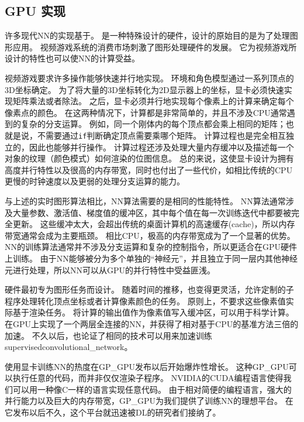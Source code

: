 \subsection{GPU 实现}
\label{sec:gpu_implementations}

许多现代\gls{NN}的实现基于。
是一种特殊设计的硬件，设计的原始目的是为了处理图形应用。
视频游戏系统的消费市场刺激了图形处理硬件的发展。
它为视频游戏所设计的特性也可以使\gls{NN}的计算受益。

视频游戏要求许多操作能够快速并行地实现。
环境和角色模型通过一系列顶点的3D坐标确定。
为了将大量的3D坐标转化为2D显示器上的坐标，显卡必须快速实现矩阵乘法或者除法。
之后，显卡必须并行地实现每个像素上的计算来确定每个像素点的颜色。
在这两种情况下，计算都是非常简单的，并且不涉及CPU通常遇到的复杂的分支运算。
例如，同一个刚体内的每个顶点都会乘上相同的矩阵；也就是说，不需要通过{\tt if}判断确定顶点需要乘哪个矩阵。
计算过程也是完全相互独立的，因此也能够并行操作。
计算过程还涉及处理大量内存缓冲以及描述每一个对象的纹理（颜色模式）如何渲染的位图信息。
总的来说，这使显卡设计为拥有高度并行特性以及很高的内存带宽，同时也付出了一些代价，如相比传统的CPU更慢的时钟速度以及更弱的处理分支运算的能力。


与上述的实时图形算法相比，\gls{NN}算法需要的是相同的性能特性。
\gls{NN}算法通常涉及大量参数、激活值、梯度值的缓冲区，其中每个值在每一次训练迭代中都要被完全更新。
这些缓冲太大，会超出传统的桌面计算机的高速缓存(cache)，所以内存带宽通常会成为主要瓶颈。
相比CPU，极高的内存带宽成为了一个显著的优势。
\gls{NN}的训练算法通常并不涉及分支运算和复杂的控制指令，所以更适合在GPU硬件上训练。
由于\gls{NN}能够被分为多个单独的``神经元''，并且独立于同一层内其他神经元进行处理，所以\gls{NN}可以从GPU的并行特性中受益匪浅。


硬件最初专为图形任务而设计。
随着时间的推移，也变得更灵活，允许定制的子程序处理转化顶点坐标或者计算像素颜色的任务。
原则上，不要求这些像素值实际基于渲染任务。
将计算的输出值作为像素值写入缓冲区，可以用于科学计算。
\citet{Steinkrau2005}在GPU上实现了一个两层全连接的\gls{NN}，并获得了相对基于CPU的基准方法三倍的加速。
不久以后，\citet{chellapilla:inria-00112631}也论证了相同的技术可以用来加速训练\gls{supervised}\gls{convolutional_network}。


使用显卡训练\gls{NN}的热度在\gls{GP_GPU}发布以后开始爆炸性增长。
这种\gls{GP_GPU}可以执行任意的代码，而并非仅仅渲染子程序。
NVIDIA的CUDA编程语言使得我们可以用一种像C一样的语言实现任意代码。
由于相对简便的编程语言，强大的并行能力以及巨大的内存带宽，\gls{GP_GPU}为我们提供了训练\gls{NN}的理想平台。
在它发布以后不久，这个平台就迅速被\gls{DL}的研究者们接纳了\citep{RainaICML09-small,Ciresan-2010}。



